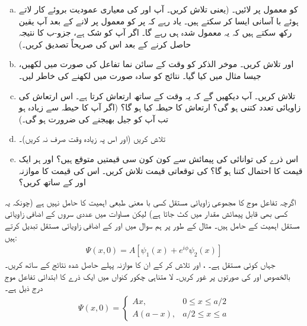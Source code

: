 \begin{enumerate}[a.]
\item 
{} کو معمول پر لائیں۔ (یعنی  تلاش کریں۔ آپ  اور  کی معیاری عمودیت بروئے کار لاتے ہوئے با آسانی ایسا کر سکتے ہیں۔ یاد رہے کہ  پر  کو معمول پر لانے کے بعد آپ یقین رکھ سکتے  ہیں کہ یہ معمول شدہ ہی رہے گا۔ اگر آپ کو شک ہے، جزو-ب کا نتیجہ حاصل کرنے کے بعد  اس کی صریحاً تصدیق کریں۔) 
\item
{} اور  تلاش کریں۔ موخر الذکر  کو وقت کے سائن نما تفاعل کی صورت میں لکھیں، جیسا مثال  میں کیا گیا۔ نتائج کو سادہ صورت میں لکھنے کی خاطر  لیں۔ 
\item 
{} تلاش کریں۔ آپ دیکھیں گے کہ یہ وقت کے ساتھ ارتعاش کرتا ہے۔ اس ارتعاش کی زاویائی تعدد کتنی ہو گی؟ ارتعاش کا حیطہ کیا ہو گا؟ (اگر آپ کا حیطہ  سے زیادہ ہو تب آپ کو جیل بھیجنے کی ضرورت ہو گی۔) 
\item 
{} تلاش کریں (اور اس پہ زیادہ وقت صرف نہ کریں)۔ 
\item
اس ذرے کی توانائی کی پیمائش سے کون کون سی قیمتیں متوقع ہیں؟ اور ہر ایک قیمت کا احتمال کتنا ہو گا؟  کی توقعاتی قیمت تلاش کریں۔ اس کی قیمت کا موازنہ  اور  کے ساتھ کریں؟
\end{enumerate}
اگرچہ تفاعل موج کا مجموعی زاویائی مستقل کسی با معنی طبعی اہمیت کا حامل نہیں ہے (چونکہ یہ کسی بھی قابل پیمائش مقدار میں کٹ جاتا ہے) لیکن  مساوات  میں عددی سروں کے اضافی زاویائی مستقل اہمیت کے حامل ہیں۔ مثال کے طور پر ہم سوال  میں   اور  کے اضافی زاویائی مستقل تبدیل کرتے ہیں:
\begin{align*}
\Psi (x,0) = A[\psi_{1} (x) + e^{i\phi}\psi_{2}(x)]
\end{align*}
جہاں  کوئی مستقل ہے۔ ،  اور  تلاش کر کے ان کا موازنہ پہلے حاصل شدہ نتائج کے ساتھ کریں۔ بالخصوص  اور   کی صورتوں پر غور کریں۔ 
لا متناہی چکور  کنواں میں ایک ذرے کا ابتدائی تفاعل موج درج ذیل ہے۔
\begin{align*}
\Psi (x,0) = 
\begin{cases}
Ax, & 0 \leq x \leq a/2 \\ 
A(a-x), & a/2 \leq x \leq a
\end{cases}
\end{align*}

